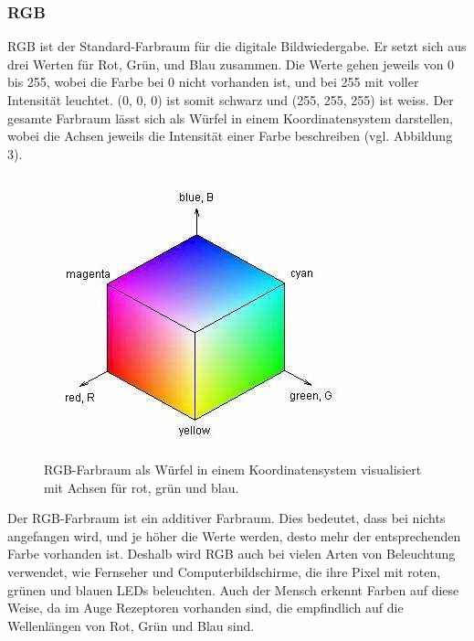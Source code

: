 \documentclass[a4paper, 12pt]{article}
\begin{document}
\subsubsection{RGB}
RGB ist der Standard-Farbraum für die digitale Bildwiedergabe. Er setzt sich aus drei Werten für Rot, Grün, und Blau zusammen. Die Werte gehen jeweils von 0 bis 255, wobei die Farbe bei 0 nicht vorhanden ist, und bei 255 mit voller Intensität leuchtet. (0, 0, 0) ist somit schwarz und (255, 255, 255) ist weiss. Der gesamte Farbraum lässt sich als Würfel in einem Koordinatensystem darstellen, wobei die Achsen jeweils die Intensität einer Farbe beschreiben (vgl. Abbildung 3).
\begin{figure}[H]
\includegraphics[scale=0.5]{RGB_Wuerfel}
\caption{RGB-Farbraum als Würfel in einem Koordinatensystem visualisiert mit Achsen für rot, grün und blau. \cite{RGBBild}}
\end{figure}
 Der RGB-Farbraum ist ein additiver Farbraum. Dies bedeutet, dass bei nichts angefangen wird, und je höher die Werte werden, desto mehr der entsprechenden Farbe vorhanden ist. \cite{RGBHSV}
\newline 
 Deshalb wird RGB auch bei vielen Arten von Beleuchtung verwendet, wie Fernseher und Computerbildschirme, die ihre Pixel mit roten, grünen und blauen LEDs beleuchten. Auch der Mensch erkennt Farben auf diese Weise, da im Auge Rezeptoren vorhanden sind, die empfindlich auf die Wellenlängen von Rot, Grün und Blau sind.
\end{document}
